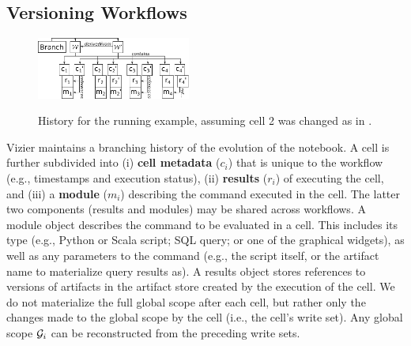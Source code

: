 
\subsection{Versioning Workflows}
\label{sec:vizier-history}

\begin{figure}
  \centering
  \includegraphics[width=0.45\textwidth]{graphics/history.pdf}\\[-3mm]
  \caption{History for the running example, assuming cell 2 was changed as in .}
  \label{fig:exampleHistory}
\end{figure}
Vizier maintains a branching history of the evolution of the notebook.
A cell is further subdivided into (i) \textbf{cell metadata} ($c_i$) that is unique to the workflow (e.g., timestamps and execution status), (ii) \textbf{results} ($r_i$) of executing the cell, and (iii) a \textbf{module} ($m_i$) describing the command executed in the cell.
The latter two components (results and modules) may be shared across workflows.
A module object describes the command to be evaluated in a cell.  
This includes its type (e.g., Python or Scala script; SQL query; or one of the graphical widgets), as well as any parameters to the command (e.g., the script itself, or the artifact name to materialize query results as). 
A results object stores references to versions of artifacts in the artifact store created by the execution of the cell. 
We do not materialize the full global scope after each cell, but rather only the changes made to the global scope by the cell (i.e., the cell's write set). 
Any global scope $\mathcal G_i$ can be reconstructed from the preceding write sets.

